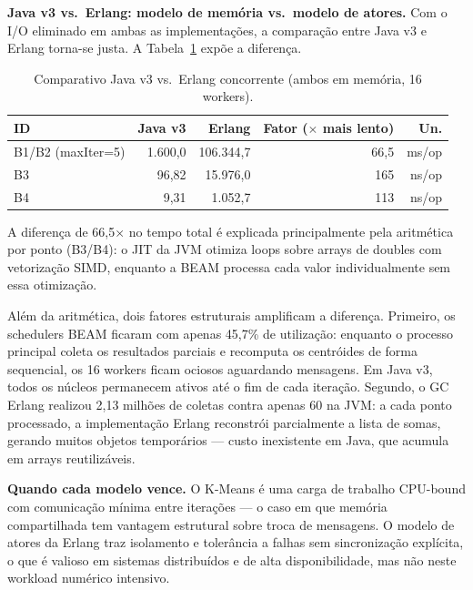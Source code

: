 \textbf{Java v3 vs.\ Erlang: modelo de memória vs.\ modelo de atores.}
Com o I/O eliminado em ambas as implementações, a comparação entre Java v3 e Erlang
torna-se justa. A Tabela~\ref{tab:bench-erlang-vs-v3} expõe a diferença.

\begin{table}[H]
\centering
\begin{tabular}{lrrrr}
\hline
\textbf{ID} & \textbf{Java v3} & \textbf{Erlang} & \textbf{Fator ($\times$ mais lento)} & \textbf{Un.} \\
\hline
B1/B2 (maxIter=5) & 1.600{,}0 & 106.344{,}7 & 66{,}5 & ms/op \\
B3                &    96{,}82 &  15.976{,}0 & 165    & ns/op \\
B4                &     9{,}31 &   1.052{,}7 & 113    & ns/op \\
\hline
\end{tabular}
\caption{Comparativo Java v3 vs.\ Erlang concorrente (ambos em memória, 16 workers).}
\label{tab:bench-erlang-vs-v3}
\end{table}

A diferença de 66,5$\times$ no tempo total é explicada principalmente pela aritmética
por ponto (B3/B4): o JIT da JVM otimiza loops sobre arrays de doubles com vetorização
SIMD, enquanto a BEAM processa cada valor individualmente sem essa otimização.

Além da aritmética, dois fatores estruturais amplificam a diferença. Primeiro, os
schedulers BEAM ficaram com apenas 45,7\% de utilização: enquanto o processo principal
coleta os resultados parciais e recomputa os centróides de forma sequencial, os 16
workers ficam ociosos aguardando mensagens. Em Java v3, todos os núcleos permanecem
ativos até o fim de cada iteração. Segundo, o GC Erlang realizou 2,13 milhões de
coletas contra apenas 60 na JVM: a cada ponto processado, a implementação Erlang
reconstrói parcialmente a lista de somas, gerando muitos objetos temporários ---
custo inexistente em Java, que acumula em arrays reutilizáveis.

\textbf{Quando cada modelo vence.}
O K-Means é uma carga de trabalho CPU-bound com comunicação mínima entre iterações
--- o caso em que memória compartilhada tem vantagem estrutural sobre troca de
mensagens. O modelo de atores da Erlang traz isolamento e tolerância a falhas sem
sincronização explícita, o que é valioso em sistemas distribuídos e de alta
disponibilidade, mas não neste workload numérico intensivo.
